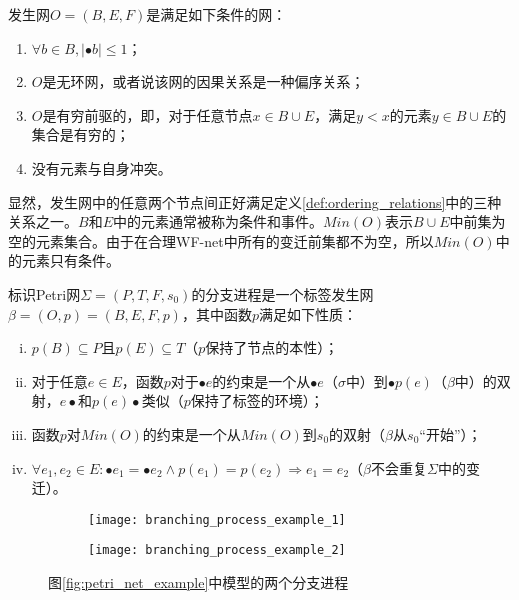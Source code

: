 \begin{definition}[发生网]\label{def:occurrence_net}
发生网$O=(B,E,F)$是满足如下条件的网：
  \begin{enumerate}[(1)]
  	\item $\forall b\in B,|\bullet b|\leq 1$；
  	\item $O$是无环网，或者说该网的因果关系是一种偏序关系；
  	\item $O$是有穷前驱的，即，对于任意节点$x\in B\cup E$，满足$y<x$的元素$y\in B\cup E$的集合是有穷的；
  	\item 没有元素与自身冲突。
  \end{enumerate}
\end{definition}

显然，发生网中的任意两个节点间正好满足定义\ref{def:ordering_relations}中的三种关系之一。$B$和$E$中的元素通常被称为条件和事件。$Min(O)$表示$B\cup E$中前集为空的元素集合。由于在合理WF-net中所有的变迁前集都不为空，所以$Min(O)$中的元素只有条件。

\begin{definition}[分支进程]\label{def:branching_process}
标识Petri网$\Sigma=(P,T,F,s_{0})$的分支进程是一个标签发生网$\beta=(O,p)=(B,E,F,p)$，其中函数$p$满足如下性质：
  \begin{enumerate}[(i)]
  	\item $p(B)\subseteq P$且$p(E)\subseteq T$（$p$保持了节点的本性）；
  	\item 对于任意$e\in E$，函数$p$对于$\bullet e$的约束是一个从$\bullet e$（$\sigma$中）到$\bullet p(e)$（$\beta$中）的双射，$e\bullet$和$p(e)\bullet$类似（$p$保持了标签的环境）；
  	\item 函数$p$对$Min(O)$的约束是一个从$Min(O)$到$s_{0}$的双射（$\beta$从$s_{0}$“开始”）；
  	\item $\forall e_{1},e_{2}\in E:\bullet e_{1}=\bullet e_{2}\wedge p(e_{1})=p(e_{2})\Rightarrow e_{1}=e_{2}$（$\beta$不会重复$\Sigma$中的变迁）。
  \end{enumerate}
\end{definition}

\begin{figure}[htbp]
  \centering
  \begin{subfigure}{1\textwidth}
  	\centering
  	\texttt{[image: branching\_process\_example\_1]}
  	\caption{\label{fig:branching_process_example_1}}
  \end{subfigure}
  \begin{subfigure}{1\textwidth}
  	\centering
  	\texttt{[image: branching\_process\_example\_2]}
  	\caption{\label{fig:branching_process_example_2}}
  \end{subfigure}
  \caption{图\ref{fig:petri_net_example}中模型的两个分支进程}
\end{figure}

